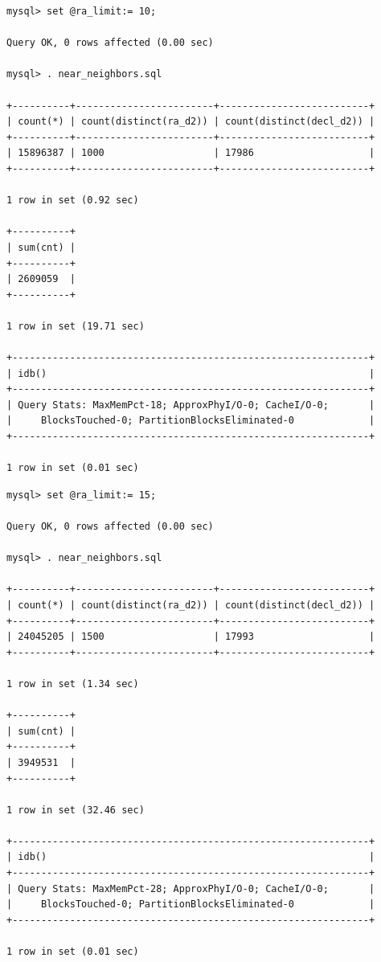 \documentclass[DM,lsstdraft,toc]{lsstdoc}
\begin{document}
\begin{verbatim}
mysql> set @ra_limit:= 10;

Query OK, 0 rows affected (0.00 sec)

mysql> . near_neighbors.sql

+----------+------------------------+--------------------------+
| count(*) | count(distinct(ra_d2)) | count(distinct(decl_d2)) |
+----------+------------------------+--------------------------+
| 15896387 | 1000                   | 17986                    |
+----------+------------------------+--------------------------+

1 row in set (0.92 sec)

+----------+
| sum(cnt) |
+----------+
| 2609059  |
+----------+

1 row in set (19.71 sec)

+--------------------------------------------------------------+
| idb()                                                        |
+--------------------------------------------------------------+
| Query Stats: MaxMemPct-18; ApproxPhyI/O-0; CacheI/O-0;       |
|     BlocksTouched-0; PartitionBlocksEliminated-0             |
+--------------------------------------------------------------+

1 row in set (0.01 sec)
\end{verbatim}

\begin{verbatim}
mysql> set @ra_limit:= 15;

Query OK, 0 rows affected (0.00 sec)

mysql> . near_neighbors.sql

+----------+------------------------+--------------------------+
| count(*) | count(distinct(ra_d2)) | count(distinct(decl_d2)) |
+----------+------------------------+--------------------------+
| 24045205 | 1500                   | 17993                    |
+----------+------------------------+--------------------------+

1 row in set (1.34 sec)

+----------+
| sum(cnt) |
+----------+
| 3949531  |
+----------+

1 row in set (32.46 sec)

+--------------------------------------------------------------+
| idb()                                                        |
+--------------------------------------------------------------+
| Query Stats: MaxMemPct-28; ApproxPhyI/O-0; CacheI/O-0;       |
|     BlocksTouched-0; PartitionBlocksEliminated-0             |
+--------------------------------------------------------------+

1 row in set (0.01 sec)
\end{verbatim}
\end{document}
